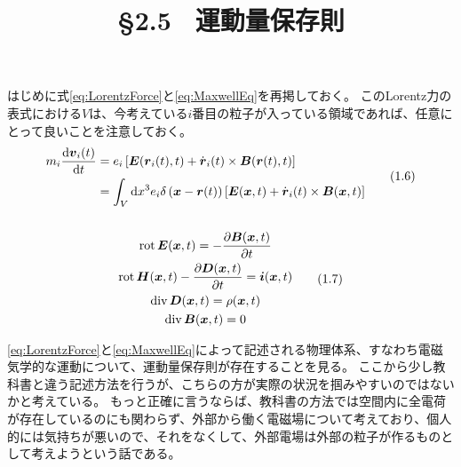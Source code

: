 \documentclass[a4paper]{jsarticle}
\title{\S 2.5 \ 運動量保存則}
\def\vec#1{\mbox{\boldmath $#1$}}
\newcommand{\dif}[2]{\frac{{\rm d} #1}{{\rm d} #2}}
\newcommand{\pdif}[2]{\frac{\partial #1}{\partial #2}}
\newcommand{\ddif}{{\rm d}}
\DeclareMathOperator{\Div}{div}
\DeclareMathOperator{\Rot}{rot}
\begin{document}
\maketitle

はじめに式\eqref{eq:LorentzForce}と\eqref{eq:MaxwellEq}を再掲しておく。
このLorentz力の表式における$V$は、今考えている$i$番目の粒子が入っている領域であれば、任意にとって良いことを注意しておく。
\begin{gather}
	\begin{aligned}
		m_i \dif{\vec{v}_i(t)}{t} &= e_i\left[
			\vec{E}(\vec{r}_i(t), t) + \dot{\vec{r}}_i(t) \times \vec{B}(\vec{r}(t),t)
		\right] \\
		&= \int_V \ddif x^3 e_i \delta\left(\vec{x} - \vec{r}(t)\right) \left[
			\vec{E}(\vec{x}, t) + \dot{\vec{r}}_i(t) \times \vec{B}(\vec{x}, t)
		\right]
	\end{aligned}\tag{1.6} \label{eq:LorentzForce}\\
	\\
	\begin{gathered}
		\Rot{\vec{E}(\vec{x}, t)} = -\pdif{\vec{B}(\vec{x}, t)}{t} \\
		\Rot \vec{H}(\vec{x}, t) - \pdif{\vec{D}(\vec{x}, t)}{t} = \vec{i}(\vec{x}, t) \\
		\Div \vec{D}(\vec{x}, t) = \rho(\vec{x}, t) \\
		\Div \vec{B}(\vec{x}, t) = 0
	\end{gathered} \tag{1.7} \label{eq:MaxwellEq}
\end{gather}

\eqref{eq:LorentzForce}と\eqref{eq:MaxwellEq}によって記述される物理体系、すなわち電磁気学的な運動について、運動量保存則が存在することを見る。
ここから少し教科書と違う記述方法を行うが、こちらの方が実際の状況を掴みやすいのではないかと考えている。
もっと正確に言うならば、教科書の方法では空間内に全電荷が存在しているのにも関わらず、外部から働く電磁場について考えており、個人的には気持ちが悪いので、それをなくして、外部電場は外部の粒子が作るものとして考えようという話である。
\end{document}
